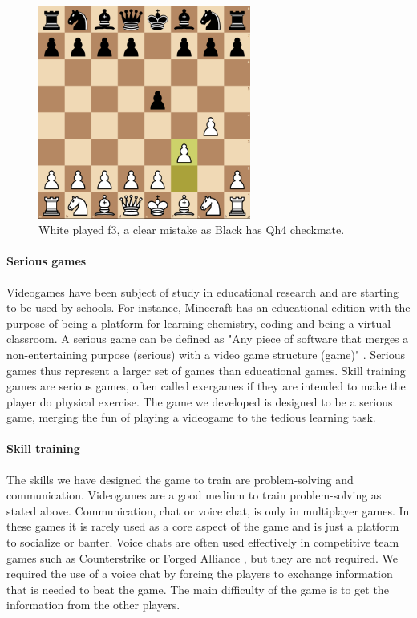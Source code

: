 \documentclass[12pt]{article}
\begin{document}
\begin{figure}[H]
\begin{center}
\includegraphics[height=7cm]{chess}
\end{center}
\caption{White played f3, a clear mistake as Black has Qh4 checkmate.}
\end{figure}



\paragraph{Serious games}
Videogames have been subject of study in educational research and are starting to be used by schools. For instance, Minecraft \cite{minecraft} has an educational edition with the purpose of being a platform for learning chemistry, coding and being a virtual classroom. A serious game can be defined as "Any piece of software that merges a non-entertaining purpose (serious) with a video game structure (game)" \cite{serious}. Serious games thus represent a larger set of games than educational games. Skill training games are serious games, often called exergames if they are intended to make the player do physical exercise. The game we developed is designed to be a serious game, merging the fun of playing a videogame to the tedious learning task. 

\paragraph{Skill training} 
The skills we have designed the game to train are problem-solving and communication. Videogames are a good medium to train problem-solving as stated above. Communication, chat or voice chat, is only in multiplayer games. In these games it is rarely used as a core aspect of the game and is just a platform to socialize or banter. Voice chats are often used effectively in competitive team games such as Counterstrike \cite{counterstrike} or Forged Alliance \cite{faf}, but they are not required. We required the use of a voice chat by forcing the players to exchange information that is needed to beat the game. The main difficulty of the game is to get the information from the other players. 
\end{document}
